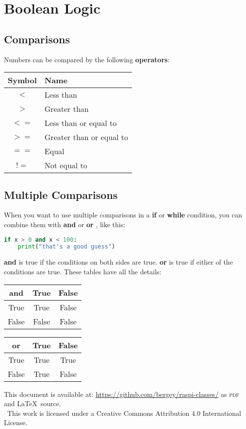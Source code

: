 \documentclass{article}
\newcommand\And{\textbf{and} }
\newcommand\Or{\textbf{or} }
\begin{document}
\section*{Boolean Logic}

\subsection*{Comparisons}

Numbers can be compared by the following \textbf{operators}:

\begin{center}
\begin{tabular}{c l}
  Symbol & Name \\
  \midrule
  $<$ & Less than\\
  $>$ & Greater than\\
  $<=$ & Less than or equal to\\
  $>=$ & Greater than or equal to\\
  $==$ & Equal\\
  $!=$ & Not equal to
\end{tabular}
\end{center}

\subsection*{Multiple Comparisons}

When you want to use multiple comparisons in a \textbf{if} or \textbf{while} condition, you can combine them with \And or \Or, like this:

\begin{lstlisting}[language=Python]
  if x > 0 and x < 100:
    print("that's a good guess")
\end{lstlisting}

\And is true if the conditions on both sides are true.  \Or is true if either of the conditions are true.  These tables have all the details:

\begin{center}
  \begin{tabular}{c | c c}
    \And & True & False\\
    \midrule
    True & True & False\\
    False & False & False    
  \end{tabular}
\end{center}

\begin{center}
  \begin{tabular}{c | c c}
    \Or & True & False\\
    \midrule
    True & True & True\\
    False & True & False
  \end{tabular}
\end{center}

This document is available at: \url{https://github.com/bergey/raspi-classes/} as \textsc{pdf} and \LaTeX\ source.\\
\ccby \ This work is licensed under a Creative Commons Attribution 4.0 International License.
\end{document}
